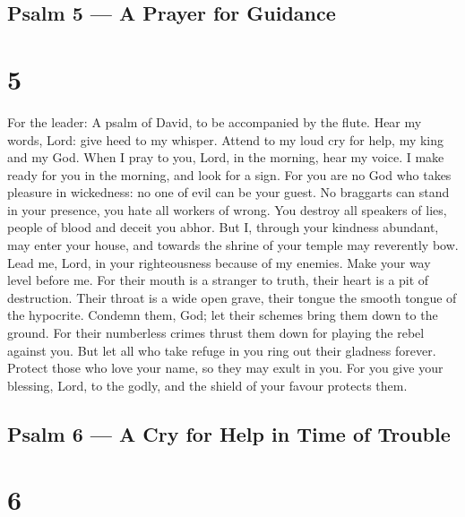 \hypertarget{psalm-5-a-prayer-for-guidance}{%
\subsection{Psalm 5 --- A Prayer for
Guidance}\label{psalm-5-a-prayer-for-guidance}}

\hypertarget{section-4}{%
\section{5}\label{section-4}}

For the leader: A psalm of David, to be accompanied by the flute.
 Hear my words, Lord: give heed to my whisper. 
Attend to my loud cry for help, my king and my God.  When I
pray to you, Lord, in the morning, hear my voice. I make ready for you
in the morning, and look for a sign.  For you are no God who
takes pleasure in wickedness: no one of evil can be your guest.
 No braggarts can stand in your presence, you hate all
workers of wrong.  You destroy all speakers of lies, people
of blood and deceit you abhor.  But I, through your kindness
abundant, may enter your house, and towards the shrine of your temple
may reverently bow.  Lead me, Lord, in your righteousness
because of my enemies. Make your way level before me.  For
their mouth is a stranger to truth, their heart is a pit of destruction.
Their throat is a wide open grave, their tongue the smooth tongue of the
hypocrite.  Condemn them, God; let their schemes bring them
down to the ground. For their numberless crimes thrust them down for
playing the rebel against you.  But let all who take refuge
in you ring out their gladness forever. Protect those who love your
name, so they may exult in you.  For you give your
blessing, Lord, to the godly, and the shield of your favour protects
them.

\hypertarget{psalm-6-a-cry-for-help-in-time-of-trouble}{%
\subsection{Psalm 6 --- A Cry for Help in Time of
Trouble}\label{psalm-6-a-cry-for-help-in-time-of-trouble}}

\hypertarget{section-5}{%
\section{6}\label{section-5}}

